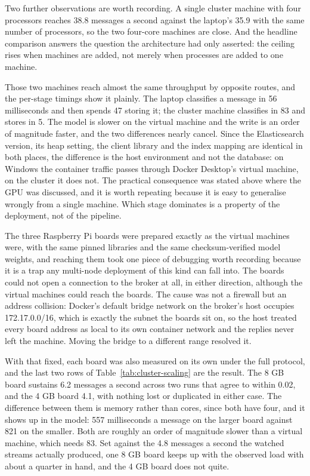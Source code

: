 Two further observations are worth recording. A single cluster machine with four processors reaches 38.8 messages a second against the laptop's 35.9 with the same number of processors, so the two four-core machines are close. And the headline comparison answers the question the architecture had only asserted: the ceiling rises when machines are added, not merely when processes are added to one machine.

Those two machines reach almost the same throughput by opposite routes, and the per-stage timings show it plainly. The laptop classifies a message in 56 milliseconds and then spends 47 storing it; the cluster machine classifies in 83 and stores in 5. The model is slower on the virtual machine and the write is an order of magnitude faster, and the two differences nearly cancel. Since the Elasticsearch version, its heap setting, the client library and the index mapping are identical in both places, the difference is the host environment and not the database: on Windows the container traffic passes through Docker Desktop's virtual machine, on the cluster it does not. The practical consequence was stated above where the GPU was discussed, and it is worth repeating because it is easy to generalise wrongly from a single machine. Which stage dominates is a property of the deployment, not of the pipeline.

The three Raspberry Pi boards were prepared exactly as the virtual machines were, with the same pinned libraries and the same checksum-verified model weights, and reaching them took one piece of debugging worth recording because it is a trap any multi-node deployment of this kind can fall into. The boards could not open a connection to the broker at all, in either direction, although the virtual machines could reach the boards. The cause was not a firewall but an address collision: Docker's default bridge network on the broker's host occupies 172.17.0.0/16, which is exactly the subnet the boards sit on, so the host treated every board address as local to its own container network and the replies never left the machine. Moving the bridge to a different range resolved it.

With that fixed, each board was also measured on its own under the full protocol, and the last two rows of Table~\ref{tab:cluster-scaling} are the result. The 8 GB board sustains 6.2 messages a second across two runs that agree to within 0.02, and the 4 GB board 4.1, with nothing lost or duplicated in either case. The difference between them is memory rather than cores, since both have four, and it shows up in the model: 557 milliseconds a message on the larger board against 821 on the smaller. Both are roughly an order of magnitude slower than a virtual machine, which needs 83. Set against the 4.8 messages a second the watched streams actually produced, one 8 GB board keeps up with the observed load with about a quarter in hand, and the 4 GB board does not quite.

